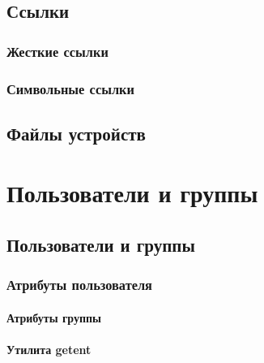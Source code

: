 \documentclass[oneside]{book}
\begin{document}
		
	\chapter{Ссылки}
	
	
		\section{Жесткие ссылки}
		
		
		\section{Символьные ссылки}
		

	\chapter{Файлы устройств}
	




\part{Пользователи и группы}
%

	\chapter{Пользователи и группы}
	
	
		\section{Атрибуты пользователя}
		
		
			\subsection{Атрибуты группы}
			
		
			\subsection{Утилита getent}
			
		
\end{document}

